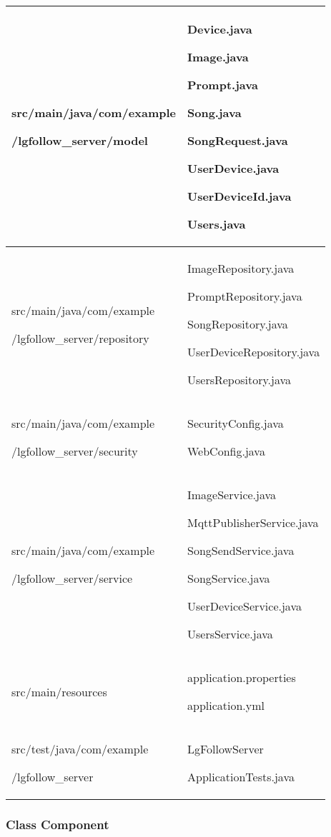 \documentclass[conference]{IEEEtran}
\begin{document}
\begin{table}[h!]
\begin{tabular}{|p{4.1cm}|p{4.1cm}|}
        src/main/java/com/example \par /lgfollow\_server/model & Device.java \par Image.java \par Prompt.java \par Song.java \par SongRequest.java \par UserDevice.java \par UserDeviceId.java \par Users.java \\ \hline
        src/main/java/com/example \par /lgfollow\_server/repository & ImageRepository.java \par PromptRepository.java \par SongRepository.java \par UserDeviceRepository.java \par UsersRepository.java \\ \hline
        src/main/java/com/example\par /lgfollow\_server/security & SecurityConfig.java \par WebConfig.java \\ \hline
        src/main/java/com/example \par /lgfollow\_server/service & ImageService.java \par MqttPublisherService.java \par SongSendService.java \par SongService.java \par UserDeviceService.java \par UsersService.java \\ \hline
        src/main/resources & application.properties \par application.yml \\ \hline
        src/test/java/com/example \par /lgfollow\_server & LgFollowServer\par ApplicationTests.java \\ \hline
    \end{tabular}
\end{table}

\subsubsection{Class Component}
\end{document}
